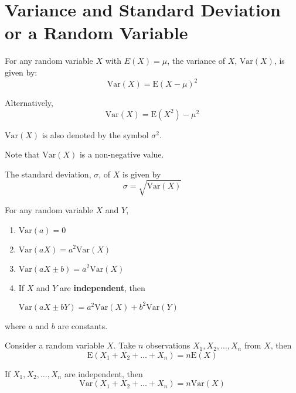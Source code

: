 \documentclass[11pt,a4paper]{book}
\begin{document}
\newpage


\section{Variance and Standard Deviation or a Random Variable}

\begin{tcolorbox}[colback=blue!5, colframe=black, boxrule=.4pt, sharpish corners]

For any random variable $X$ with $E\left(X\right)=\mu$, the variance
of $X$, $\text{Var}\left(X\right)$, is given by:
\[
\text{Var}\left(X\right)=\text{E}\left(X-\mu\right)^{2}
\]

Alternatively,
\[
\text{Var}\left(X\right)=\text{E}\left(X^{2}\right)-\mu^{2}
\]

$\text{Var}\left(X\right)$ is also denoted by the symbol $\sigma^{2}$.

Note that $\text{Var}\left(X\right)$ is a non-negative value.

The standard deviation, $\sigma$, of $X$ is given by
\[
\sigma=\sqrt{\text{Var}\left(X\right)}
\]

For any random variable $X$ and $Y$,

\begin{enumerate}[label=(\alph*)]

\item  $\text{Var}\left(a\right)=0$

\item $\text{Var}\left(aX\right)=a^{2}\text{Var}\left(X\right)$

\item $\text{Var}\left(aX\pm b\right)=a^{2}\text{Var}\left(X\right)$

\item  If $X$ and $Y$ are \textbf{independent}, then

$\text{Var}\left(aX\pm bY\right)=a^{2}\text{Var}\left(X\right)+b^{2}\text{Var}\left(Y\right)$

\end{enumerate}

where $a$ and $b$ are constants.

Consider a random variable $X$. Take $n$ observations $X_{1},X_{2},\ldots,X_{n}$
from $X$, then
\[
\text{E}\left(X_{1}+X_{2}+\ldots+X_{n}\right)=n\text{E}\left(X\right)
\]

If $X_{1},X_{2},\ldots,X_{n}$ are independent, then
\[
\text{Var}\left(X_{1}+X_{2}+\ldots+X_{n}\right)=n\text{Var}\left(X\right)
\]

\end{tcolorbox}
\end{document}
